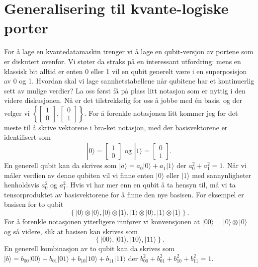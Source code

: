 \section{Generalisering til kvante-logiske porter}
For å lage en kvantedatamaskin trenger vi å lage en qubit-versjon av portene som er diskutert ovenfor. Vi støter da straks på en interessant utfordring: mens en klassisk bit alltid er enten 0 eller 1 vil en qubit generelt være i en superposisjon av 0 og 1. Hvordan skal vi lage sannhetstabellene når qubitene har et kontinuerlig sett av mulige verdier? La oss først få på plass litt notasjon som er nyttig i den videre diskusjonen. Nå er det tilstrekkelig for oss å jobbe med \'en basis, og der velger vi $\left\{ \left[\begin{array}{rr}1\\0\end{array}\right], \left[\begin{array}{rr}0\\1\end{array}\right] \right\}$. For å forenkle notasjonen litt kommer jeg for det meste til å skrive vektorene i bra-ket notasjon, med der basisvektorene er identifisert som
\begin{displaymath}
	|0\rangle = \left[\begin{array}{rr}1\\0\end{array}\right] \text{ og } |1\rangle =  \left[\begin{array}{rr}0\\1\end{array}\right].
\end{displaymath}
En generell qubit kan da skrives som $|a\rangle = a_0|0\rangle + a_1|1\rangle$ der $a_0^2 + a_1^2 = 1$. Når vi måler verdien av denne qubiten vil vi finne enten $|0\rangle$ eller $|1\rangle$ med sannynligheter henholdsvis $a_0^2$ og $a_1^2$. Hvis vi har mer enn en qubit å ta hensyn til, må vi ta tensorproduktet av basisvektorene for å finne den nye basisen. For eksempel er basisen for to qubit
\begin{displaymath}
	\left\{ |0\rangle\otimes|0\rangle,  |0\rangle\otimes|1\rangle,  |1\rangle\otimes|0\rangle,  |1\rangle\otimes|1\rangle  \right\}.
\end{displaymath}
For å forenkle notasjonen ytterligere innfører vi konvensjonen at $|00\rangle = |0\rangle\otimes|0\rangle$ og så videre, slik at basisen kan skrives som
\begin{displaymath}
	\left\{ |00\rangle,  |01\rangle,  |10\rangle,  |11\rangle  \right\}.
\end{displaymath}
En generell kombinasjon av to qubit kan da skrives som $|b\rangle = b_{00}|00\rangle + b_{01}|01\rangle + b_{10}|10\rangle + b_{11}|11\rangle$ der $b_{00}^2 + b_{01}^2 + b_{10}^2 + b_{11}^2 = 1$. 

